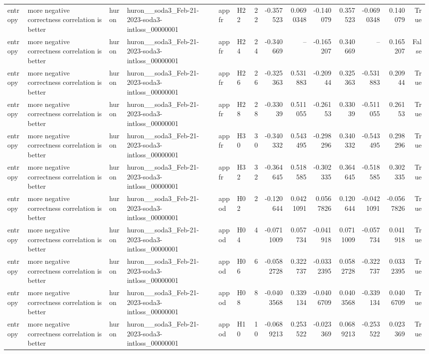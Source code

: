 \begin{longtable}{llllllrrrrrrrr}
entropy & more negative correctness correlation is better & huron & huron\_\_soda3\_Feb-21-2023-soda3-intloss\_00000001 & appfr & H22 & 22 & -0.357523 & 0.0690348 & -0.140079 & 0.357523 & -0.0690348 & 0.140079 & True \\
entropy & more negative correctness correlation is better & huron & huron\_\_soda3\_Feb-21-2023-soda3-intloss\_00000001 & appfr & H24 & 24 & -0.340669 & -- & -0.165207 & 0.340669 & -- & 0.165207 & False \\
entropy & more negative correctness correlation is better & huron & huron\_\_soda3\_Feb-21-2023-soda3-intloss\_00000001 & appfr & H26 & 26 & -0.325363 & 0.531883 & -0.20944 & 0.325363 & -0.531883 & 0.20944 & True \\
entropy & more negative correctness correlation is better & huron & huron\_\_soda3\_Feb-21-2023-soda3-intloss\_00000001 & appfr & H28 & 28 & -0.33039 & 0.511055 & -0.26153 & 0.33039 & -0.511055 & 0.26153 & True \\
entropy & more negative correctness correlation is better & huron & huron\_\_soda3\_Feb-21-2023-soda3-intloss\_00000001 & appfr & H30 & 30 & -0.340332 & 0.543495 & -0.298296 & 0.340332 & -0.543495 & 0.298296 & True \\
entropy & more negative correctness correlation is better & huron & huron\_\_soda3\_Feb-21-2023-soda3-intloss\_00000001 & appfr & H32 & 32 & -0.364645 & 0.518585 & -0.302335 & 0.364645 & -0.518585 & 0.302335 & True \\
entropy & more negative correctness correlation is better & huron & huron\_\_soda3\_Feb-21-2023-soda3-intloss\_00000001 & appod & H02 & 2 & -0.120644 & 0.0421091 & 0.0567826 & 0.120644 & -0.0421091 & -0.0567826 & True \\
entropy & more negative correctness correlation is better & huron & huron\_\_soda3\_Feb-21-2023-soda3-intloss\_00000001 & appod & H04 & 4 & -0.0711009 & 0.057734 & -0.041918 & 0.0711009 & -0.057734 & 0.041918 & True \\
entropy & more negative correctness correlation is better & huron & huron\_\_soda3\_Feb-21-2023-soda3-intloss\_00000001 & appod & H06 & 6 & -0.0582728 & 0.322737 & -0.0332395 & 0.0582728 & -0.322737 & 0.0332395 & True \\
entropy & more negative correctness correlation is better & huron & huron\_\_soda3\_Feb-21-2023-soda3-intloss\_00000001 & appod & H08 & 8 & -0.0403568 & 0.339134 & -0.0406709 & 0.0403568 & -0.339134 & 0.0406709 & True \\
entropy & more negative correctness correlation is better & huron & huron\_\_soda3\_Feb-21-2023-soda3-intloss\_00000001 & appod & H10 & 10 & -0.0689213 & 0.253522 & -0.023369 & 0.0689213 & -0.253522 & 0.023369 & True \\

\end{longtable}
